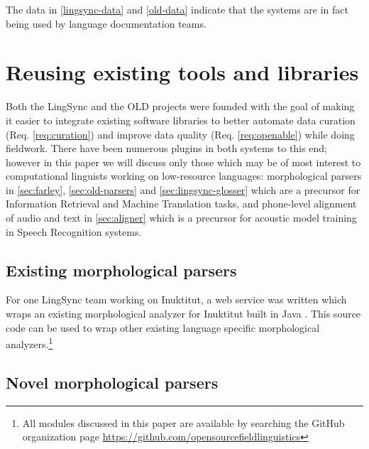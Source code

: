 \documentclass[11pt]{article}
\begin{document}
The data in \autoref{lingsync-data} and \autoref{old-data} indicate that the
systems are in fact being used by language documentation teams. 



\section{Reusing existing tools and libraries}
\label{sec:plugins}


Both the LingSync and the OLD projects were founded with the goal of making it
easier to integrate existing software
libraries to better automate data curation (Req. \autoref{req:curation}) and 
improve data quality (Req. \autoref{req:openable}) while doing fieldwork. There have been numerous
plugins in both systems to this end; however in this paper we will discuss only
those which may be of most interest to computational linguists working on
low-resource languages: morphological parsers in \autoref{sec:farley}, 
\autoref{sec:old-parsers} and \autoref{sec:lingsync-glosser} which are a
precursor for Information Retrieval and Machine Translation tasks, and 
phone-level alignment of audio and text in \autoref{sec:aligner} which is a
precursor for acoustic model training in Speech Recognition systems.



\subsection{Existing morphological parsers}
\label{sec:farley}

For one LingSync team working on Inuktitut, a web service was written which
wraps an existing morphological analyzer for Inuktitut built in Java
\cite{Farley:2012:Online}. This source code can be used to wrap other existing language specific morphological analyzers.\footnote{All modules discussed in this paper are available by searching the GitHub organization page \url{https://github.com/opensourcefieldlinguistics}} 


\subsection{Novel morphological parsers}
\label{sec:old-parsers}
\end{document}
